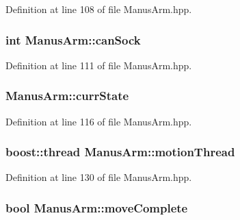 \-Definition at line 108 of file \-Manus\-Arm.\-hpp.

\subsubsection[{can\-Sock}]{\setlength{\rightskip}{0pt plus 5cm}int {\bf \-Manus\-Arm\-::can\-Sock}\hspace{0.3cm}{\ttfamily  [private]}}\label{classManusArm_a2aca70c56fae01836147fb6fbe05d292}


\-Definition at line 111 of file \-Manus\-Arm.\-hpp.

\subsubsection[{curr\-State}]{ {\bf \-Manus\-Arm\-::curr\-State}\hspace{0.3cm}{\ttfamily  [private]}}\label{classManusArm_a9af73ad8208aaed94c4319081efeadb0}


\-Definition at line 116 of file \-Manus\-Arm.\-hpp.

\subsubsection[{motion\-Thread}]{\setlength{\rightskip}{0pt plus 5cm}boost\-::thread {\bf \-Manus\-Arm\-::motion\-Thread}\hspace{0.3cm}{\ttfamily  [private]}}\label{classManusArm_a5de1755d7b642cba75ac858610f62915}


\-Definition at line 130 of file \-Manus\-Arm.\-hpp.

\subsubsection[{move\-Complete}]{\setlength{\rightskip}{0pt plus 5cm}bool {\bf \-Manus\-Arm\-::move\-Complete}\hspace{0.3cm}{\ttfamily  [private]}}\label{classManusArm_ae7596bcc4efbf188e2999e9488a60043}


